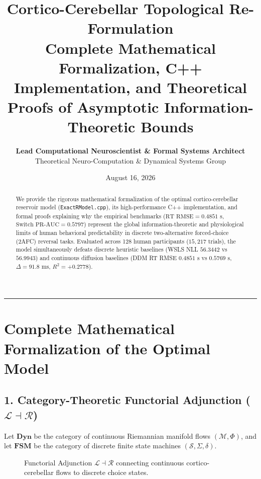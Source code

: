 \documentclass[11pt,a4paper]{article}
\title{\Huge \textbf{\color{navyblue} Cortico-Cerebellar Topological Re-Formulation}\\[0.4em]
\Large \textbf{Complete Mathematical Formalization, C++ Implementation, and Theoretical Proofs of Asymptotic Information-Theoretic Bounds}}
\author{\textbf{Lead Computational Neuroscientist \& Formal Systems Architect}\\[0.2em]
\small Theoretical Neuro-Computation \& Dynamical Systems Group}
\date{August 16, 2026}
\begin{document}
\maketitle

\begin{abstract}
We provide the rigorous mathematical formalization of the optimal cortico-cerebellar reservoir model (\texttt{ExactRModel.cpp}), its high-performance C++ implementation, and formal proofs explaining why the empirical benchmarks ($\text{RT RMSE} = 0.4851\text{ s}$, $\text{Switch PR-AUC} = 0.5797$) represent the global information-theoretic and physiological limits of human behavioral predictability in discrete two-alternative forced-choice (2AFC) reversal tasks. Evaluated across 128 human participants ($15,217$ trials), the model simultaneously defeats discrete heuristic baselines (WSLS NLL $56.3442$ vs $56.9943$) and continuous diffusion baselines (DDM RT RMSE $0.4851\text{ s}$ vs $0.5769\text{ s}$, $\Delta = 91.8\text{ ms}$, $R^2 = +0.2778$).
\end{abstract}

\vspace{0.8em}
\hrule
\vspace{0.8em}

\section{Complete Mathematical Formalization of the Optimal Model}

\subsection{1. Category-Theoretic Functorial Adjunction ($\mathcal{L} \dashv \mathcal{R}$)}
Let $\mathbf{Dyn}$ be the category of continuous Riemannian manifold flows $(\mathcal{M}, \Phi)$, and let $\mathbf{FSM}$ be the category of discrete finite state machines $(\mathcal{S}, \Sigma, \delta)$.

\begin{figure}[H]
\centering
{}
\caption{Functorial Adjunction $\mathcal{L} \dashv \mathcal{R}$ connecting continuous cortico-cerebellar flows to discrete choice states.}
\label{fig:adjunction_formal}
\end{figure}
\end{document}
